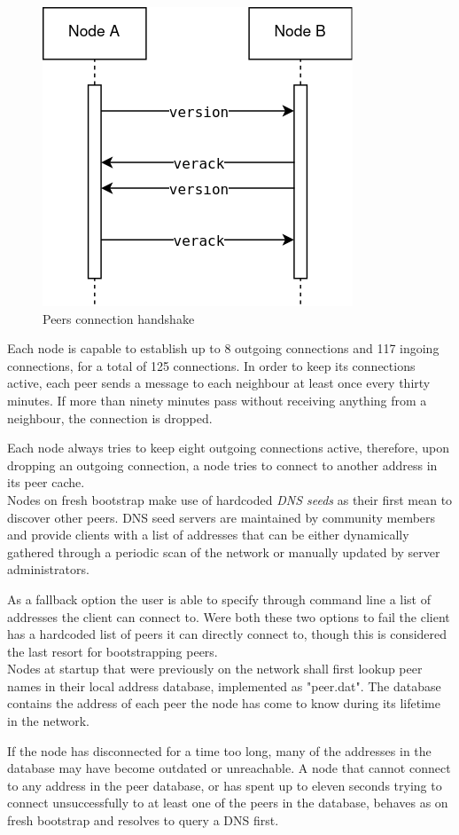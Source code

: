 \begin{figure}[h]
	\includegraphics[width=.45\textwidth]{pict/BTCconnection.png}
	\centering
	\caption{Peers connection handshake}
	\label{fig:btcconn}
\end{figure}

Each node is capable to establish up to 8 outgoing connections and 117 ingoing connections, for a total of 125 connections. In order to keep its connections active, each peer sends a message to each neighbour at least once every thirty minutes. If more than ninety minutes pass without receiving anything from a neighbour, the connection is dropped.

Each node always tries to keep eight outgoing connections active, therefore, upon dropping an outgoing connection, a node tries to connect to another address in its peer cache.\\

Nodes on fresh bootstrap make use of hardcoded \emph{DNS seeds} as their first mean to discover other peers. DNS seed servers are maintained by community members and provide clients with a list of addresses that can be either dynamically gathered through a periodic scan of the network or manually updated by server administrators.

As a fallback option the user is able to specify through command line a list of addresses the client can connect to. Were both these two options to fail the client has a hardcoded list of peers it can directly connect to, though this is considered the last resort for bootstrapping peers.\\

Nodes at startup that were previously on the network shall first lookup peer names in their local address database, implemented as "peer.dat". The database contains the address of each peer the node has come to know during its lifetime in the network.

If the node has disconnected for a time too long, many of the addresses in the database may have become outdated or unreachable. A node that cannot connect to any address in the peer database, or has spent up to eleven seconds trying to connect unsuccessfully to at least one of the peers in the database, behaves as on fresh bootstrap and resolves to query a DNS first.

